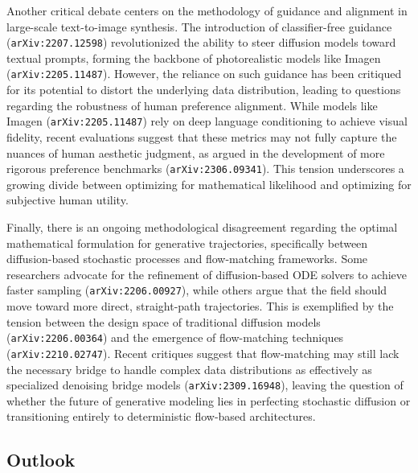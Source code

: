 \documentclass[11pt]{article}
\begin{document}
Another critical debate centers on the methodology of guidance and alignment in large-scale text-to-image synthesis. The introduction of classifier-free guidance (\texttt{arXiv:2207.12598}) revolutionized the ability to steer diffusion models toward textual prompts, forming the backbone of photorealistic models like Imagen (\texttt{arXiv:2205.11487}). However, the reliance on such guidance has been critiqued for its potential to distort the underlying data distribution, leading to questions regarding the robustness of human preference alignment. While models like Imagen (\texttt{arXiv:2205.11487}) rely on deep language conditioning to achieve visual fidelity, recent evaluations suggest that these metrics may not fully capture the nuances of human aesthetic judgment, as argued in the development of more rigorous preference benchmarks (\texttt{arXiv:2306.09341}). This tension underscores a growing divide between optimizing for mathematical likelihood and optimizing for subjective human utility.

Finally, there is an ongoing methodological disagreement regarding the optimal mathematical formulation for generative trajectories, specifically between diffusion-based stochastic processes and flow-matching frameworks. Some researchers advocate for the refinement of diffusion-based ODE solvers to achieve faster sampling (\texttt{arXiv:2206.00927}), while others argue that the field should move toward more direct, straight-path trajectories. This is exemplified by the tension between the design space of traditional diffusion models (\texttt{arXiv:2206.00364}) and the emergence of flow-matching techniques (\texttt{arXiv:2210.02747}). Recent critiques suggest that flow-matching may still lack the necessary bridge to handle complex data distributions as effectively as specialized denoising bridge models (\texttt{arXiv:2309.16948}), leaving the question of whether the future of generative modeling lies in perfecting stochastic diffusion or transitioning entirely to deterministic flow-based architectures.

\subsection{Outlook}
\end{document}
